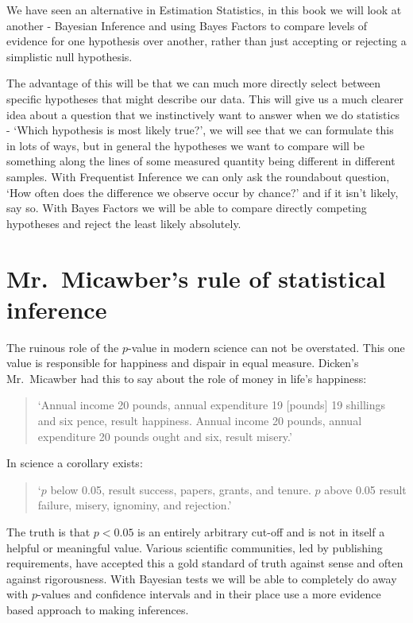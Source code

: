 \documentclass[
]{book}
\begin{document}
We have seen an alternative in Estimation Statistics, in this book we will look at another - Bayesian Inference and using Bayes Factors to compare levels of evidence for one hypothesis over another, rather than just accepting or rejecting a simplistic null hypothesis.

The advantage of this will be that we can much more directly select between specific hypotheses that might describe our data. This will give us a much clearer idea about a question that we instinctively want to answer when we do statistics - `Which hypothesis is most likely true?', we will see that we can formulate this in lots of ways, but in general the hypotheses we want to compare will be something along the lines of some measured quantity being different in different samples. With Frequentist Inference we can only ask the roundabout question, `How often does the difference we observe occur by chance?' and if it isn't likely, say so. With Bayes Factors we will be able to compare directly competing hypotheses and reject the least likely absolutely.

\hypertarget{mr.-micawbers-rule-of-statistical-inference}{%
\section{Mr.~Micawber's rule of statistical inference}\label{mr.-micawbers-rule-of-statistical-inference}}

The ruinous role of the \(p\)-value in modern science can not be overstated. This one value is responsible for happiness and dispair in equal measure. Dicken's Mr.~Micawber had this to say about the role of money in life's happiness:

\begin{quote}
`Annual income 20 pounds, annual expenditure 19 {[}pounds{]} 19 shillings and six pence, result happiness. Annual income 20 pounds, annual expenditure 20 pounds ought and six, result misery.'
\end{quote}

In science a corollary exists:

\begin{quote}
`\(p\) below 0.05, result success, papers, grants, and tenure. \(p\) above 0.05 result failure, misery, ignominy, and rejection.'
\end{quote}

The truth is that \(p < 0.05\) is an entirely arbitrary cut-off and is not in itself a helpful or meaningful value. Various scientific communities, led by publishing requirements, have accepted this a gold standard of truth against sense and often against rigorousness. With Bayesian tests we will be able to completely do away with \(p\)-values and confidence intervals and in their place use a more evidence based approach to making inferences.
\end{document}
